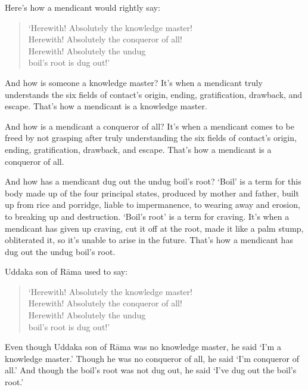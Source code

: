 \documentclass[12pt,openany]{book}%
\begin{document}
Here’s how a mendicant would rightly say: 

\begin{verse}%
‘Herewith! Absolutely the knowledge master! \\
Herewith! Absolutely the conqueror of all! \\
Herewith! Absolutely the undug \\
boil’s root is dug out!’ 

%
\end{verse}

And how is someone a knowledge master? It’s when a mendicant truly understands the six fields of contact’s origin, ending, gratification, drawback, and escape. That’s how a mendicant is a knowledge master. 

And how is a mendicant a conqueror of all? It’s when a mendicant comes to be freed by not grasping after truly understanding the six fields of contact’s origin, ending, gratification, drawback, and escape. That’s how a mendicant is a conqueror of all. 

And how has a mendicant dug out the undug boil’s root? ‘Boil’ is a term for this body made up of the four principal states, produced by mother and father, built up from rice and porridge, liable to impermanence, to wearing away and erosion, to breaking up and destruction. ‘Boil’s root’ is a term for craving. It’s when a mendicant has given up craving, cut it off at the root, made it like a palm stump, obliterated it, so it’s unable to arise in the future. That’s how a mendicant has dug out the undug boil’s root. 

Uddaka son of \textsanskrit{Rāma} used to say: 

\begin{verse}%
‘Herewith! Absolutely the knowledge master! \\
Herewith! Absolutely the conqueror of all! \\
Herewith! Absolutely the undug \\
boil’s root is dug out!’ 

%
\end{verse}

Even though Uddaka son of \textsanskrit{Rāma} was no knowledge master, he said ‘I’m a knowledge master.’ Though he was no conqueror of all, he said ‘I’m conqueror of all.’ And though the boil’s root was not dug out, he said ‘I’ve dug out the boil’s root.’ 
\end{document}
